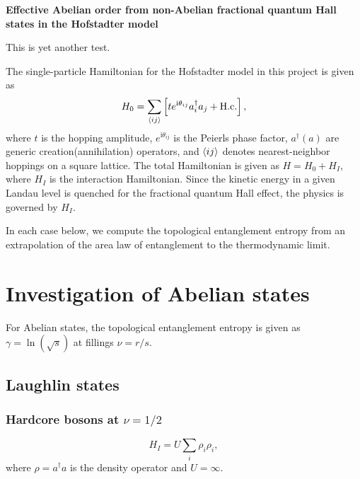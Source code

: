 \documentclass[floatfix,showpacs,amsmath,amsfonts,amssymb,aps,twocolumn, prb,groupedaddress]{revtex4-1}
\begin{document}
\onecolumngrid

\begin{center}
	\textbf{\large Effective Abelian order from non-Abelian fractional quantum Hall states in the Hofstadter model}
\end{center}
\vspace{-1em}
\tableofcontents
\vspace{1em}

This is yet another test.

The single-particle Hamiltonian for the Hofstadter model in this project is given as
\begin{equation}
\label{eq:single_ham}
H_0 = \sum_{\braket{ij}} \left[ t e^{\mathrm{i}\theta_{ij}} a_i^\dagger a_j + \text{H.c.} \right],
\end{equation}
where $t$ is the hopping amplitude, $e^{\mathrm{i}\theta_{ij}}$ is the Peierls phase factor, $a^\dagger(a)$ are generic creation(annihilation) operators, and $\braket{ij}$ denotes nearest-neighbor hoppings on a square lattice. The total Hamiltonian is given as $H=H_0+H_I$, where $H_I$ is the interaction Hamiltonian. Since the kinetic energy in a given Landau level is quenched for the fractional quantum Hall effect, the physics is governed by $H_I$.

In each case below, we compute the topological entanglement entropy from an extrapolation of the area law of entanglement to the thermodynamic limit.

\section{Investigation of Abelian states}

For Abelian states, the topological entanglement entropy is given as $\gamma=\ln(\sqrt{s})$ at fillings $\nu=r/s$.~\cite{Estienne15}

\subsection{Laughlin states}

\subsubsection{Hardcore bosons at $\nu=1/2$}

\begin{equation}
H_I = U \sum_i \rho_i \rho_i,
\end{equation}
where $\rho=a^\dagger a$ is the density operator and $U=\infty$.
\end{document}
